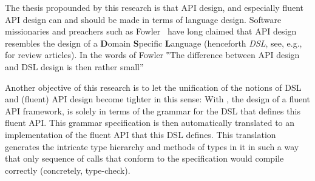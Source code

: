 The thesis propounded by this research is that API design, and especially
fluent API design
  can and should be made in terms of language design. Software missionaries
  and preachers such as Fowler~\cite{Fowler:2005} have long claimed that API
  design resembles the design of a \textbf Domain \textbf Specific \textbf
  Language (henceforth \emph{DSL}, see,
  e.g.,~\cite{VanDeursen:Klint:2000,Hudak:1997,Fowler:2010} for review
  articles).
   In the words of Fowler ‟The difference between API design and DSL design is
   then rather small”~\cite{Fowler:2005}

Another objective of this research is to let the unification of the notions of
DSL and (fluent) API design become tighter in this sense: With \Self, the
design of a fluent API framework, is solely in terms of the grammar for the DSL
that defines this fluent API\@. This grammar specification is then
automatically translated to an implementation of the fluent API that this DSL
defines. This translation generates the intricate type hierarchy
  and methods of types in it in such a way
  that only sequence of calls that conform
  to the specification would
  compile correctly (concretely, type-check).

